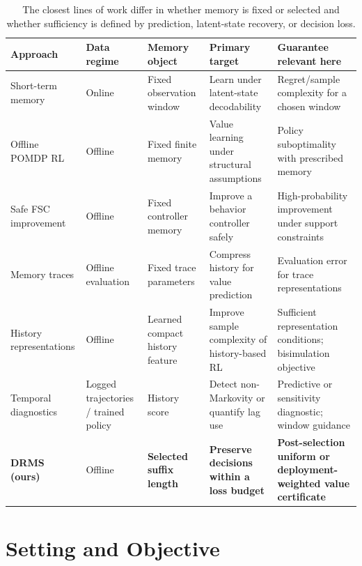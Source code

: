 \documentclass[letterpaper]{article} %
\theoremstyle{remark}
\begin{document}
\begin{table}[t]
\centering
\small
\begin{tabular}{>{\raggedright\arraybackslash}p{}
                >{\raggedright\arraybackslash}p{}
                >{\raggedright\arraybackslash}p{}
                >{\raggedright\arraybackslash}p{}
                >{\raggedright\arraybackslash}p{}}
\toprule
Approach & Data regime & Memory object & Primary target & Guarantee relevant here \\
\midrule
Short-term memory \citep{efroni2022short} & Online & Fixed observation window & Learn under latent-state decodability & Regret/sample complexity for a chosen window \\
Offline POMDP RL \citep{guo2022offlinepomdp} & Offline & Fixed finite memory & Value learning under structural assumptions & Policy suboptimality with prescribed memory \\
Safe FSC improvement \citep{simao2023safe} & Offline & Fixed controller memory & Improve a behavior controller safely & High-probability improvement under support constraints \\
Memory traces \citep{eberhard2025traces} & Offline evaluation & Fixed trace parameters & Compress history for value prediction & Evaluation error for trace representations \\
History representations \citep{hong2024histories} & Offline & Learned compact history feature & Improve sample complexity of history-based RL & Sufficient representation conditions; bisimulation objective \\
Temporal diagnostics \citep{mysore2026mvs,lafuente2025temporal} & Logged trajectories / trained policy & History score & Detect non-Markovity or quantify lag use & Predictive or sensitivity diagnostic; window guidance \\
\textbf{DRMS (ours)} & Offline & \textbf{Selected suffix length} & \textbf{Preserve decisions within a loss budget} & \textbf{Post-selection uniform or deployment-weighted value certificate} \\
\bottomrule
\end{tabular}
\caption{The closest lines of work differ in whether memory is fixed or
selected and whether sufficiency is defined by prediction, latent-state
recovery, or decision loss.}
\label{tab:related}
\end{table}

\section{Setting and Objective}
\end{document}
